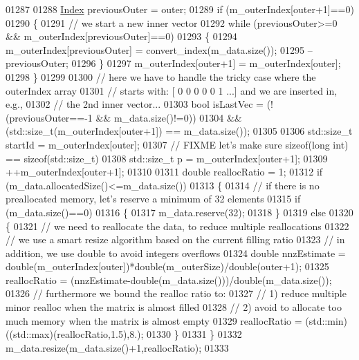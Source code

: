 \begin{DoxyCode}
01287 
01288   \hyperlink{group___core___module_a554f30542cc2316add4b1ea0a492ff02}{Index} previousOuter = outer;
01289   \textcolor{keywordflow}{if} (m\_outerIndex[outer+1]==0)
01290   \{
01291     \textcolor{comment}{// we start a new inner vector}
01292     \textcolor{keywordflow}{while} (previousOuter>=0 && m\_outerIndex[previousOuter]==0)
01293     \{
01294       m\_outerIndex[previousOuter] = convert\_index(m\_data.size());
01295       --previousOuter;
01296     \}
01297     m\_outerIndex[outer+1] = m\_outerIndex[outer];
01298   \}
01299 
01300   \textcolor{comment}{// here we have to handle the tricky case where the outerIndex array}
01301   \textcolor{comment}{// starts with: [ 0 0 0 0 0 1 ...] and we are inserted in, e.g.,}
01302   \textcolor{comment}{// the 2nd inner vector...}
01303   \textcolor{keywordtype}{bool} isLastVec = (!(previousOuter==-1 && m\_data.size()!=0))
01304                 && (std::size\_t(m\_outerIndex[outer+1]) == m\_data.size());
01305 
01306   std::size\_t startId = m\_outerIndex[outer];
01307   \textcolor{comment}{// FIXME let's make sure sizeof(long int) == sizeof(std::size\_t)}
01308   std::size\_t p = m\_outerIndex[outer+1];
01309   ++m\_outerIndex[outer+1];
01310 
01311   \textcolor{keywordtype}{double} reallocRatio = 1;
01312   \textcolor{keywordflow}{if} (m\_data.allocatedSize()<=m\_data.size())
01313   \{
01314     \textcolor{comment}{// if there is no preallocated memory, let's reserve a minimum of 32 elements}
01315     \textcolor{keywordflow}{if} (m\_data.size()==0)
01316     \{
01317       m\_data.reserve(32);
01318     \}
01319     \textcolor{keywordflow}{else}
01320     \{
01321       \textcolor{comment}{// we need to reallocate the data, to reduce multiple reallocations}
01322       \textcolor{comment}{// we use a smart resize algorithm based on the current filling ratio}
01323       \textcolor{comment}{// in addition, we use double to avoid integers overflows}
01324       \textcolor{keywordtype}{double} nnzEstimate = double(m\_outerIndex[outer])*double(m\_outerSize)/double(outer+1);
01325       reallocRatio = (nnzEstimate-double(m\_data.size()))/double(m\_data.size());
01326       \textcolor{comment}{// furthermore we bound the realloc ratio to:}
01327       \textcolor{comment}{//   1) reduce multiple minor realloc when the matrix is almost filled}
01328       \textcolor{comment}{//   2) avoid to allocate too much memory when the matrix is almost empty}
01329       reallocRatio = (std::min)((std::max)(reallocRatio,1.5),8.);
01330     \}
01331   \}
01332   m\_data.resize(m\_data.size()+1,reallocRatio);
01333 

\end{DoxyCode}
